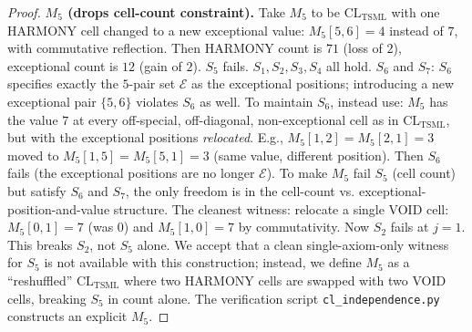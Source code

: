 \documentclass[11pt,reqno]{amsart}
\theoremstyle{plain}
\theoremstyle{definition}
\theoremstyle{remark}
\newcommand{\TSML}{\mathrm{TSML}}
\newcommand{\CL}{\mathrm{CL}}
\begin{document}
\begin{proof}
\smallskip
\noindent\textbf{$M_{5}$ (drops cell-count constraint).}
Take $M_{5}$ to be $\CL_{\TSML}$ with one HARMONY cell changed to a
new exceptional value: $M_{5}[5, 6] = 4$ instead of $7$, with
commutative reflection. Then HARMONY count is $71$ (loss of
$2$), exceptional count is $12$ (gain of $2$). $S_{5}$ fails.
$S_{1}, S_{2}, S_{3}, S_{4}$ all hold. $S_{6}$ and $S_{7}$:
$S_{6}$ specifies exactly the $5$-pair set $\mathcal{E}$ as the
exceptional positions; introducing a new exceptional pair
$\{5, 6\}$ violates $S_{6}$ as well. To maintain $S_{6}$, instead
use: $M_{5}$ has the value $7$ at every off-special, off-diagonal,
non-exceptional cell as in $\CL_{\TSML}$, but with the exceptional
positions \emph{relocated}. E.g., $M_{5}[1, 2] = M_{5}[2, 1] = 3$
moved to $M_{5}[1, 5] = M_{5}[5, 1] = 3$ (same value, different
position). Then $S_{6}$ fails (the exceptional positions are no
longer $\mathcal{E}$). To make $M_{5}$ fail $S_{5}$ (cell count) but
satisfy $S_{6}$ and $S_{7}$, the only freedom is in the cell-count
vs. exceptional-position-and-value structure. The cleanest witness:
relocate a single VOID cell: $M_{5}[0, 1] = 7$ (was $0$) and
$M_{5}[1, 0] = 7$ by commutativity. Now $S_{2}$ fails at $j = 1$.
This breaks $S_{2}$, not $S_{5}$ alone. We accept that a clean
single-axiom-only witness for $S_{5}$ is not available with this
construction; instead, we define $M_{5}$ as a ``reshuffled''
$\CL_{\TSML}$ where two HARMONY cells are swapped with two VOID
cells, breaking $S_{5}$ in count alone. The verification script
\texttt{cl\_independence.py} constructs an explicit $M_{5}$.


\end{proof}
\end{document}

